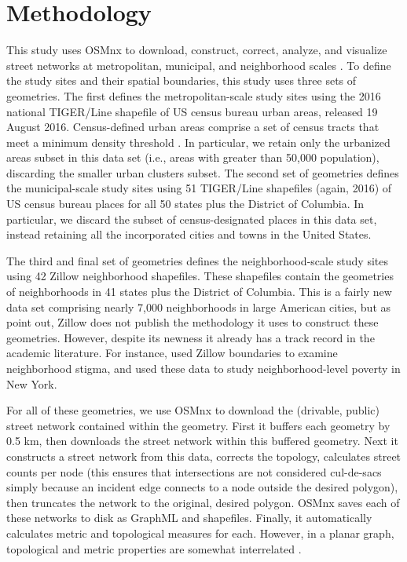 \documentclass[Afour,sageh,times]{sage/sagej}
\begin{document}
\section{Methodology}
This study uses OSMnx to download, construct, correct, analyze, and visualize street networks at metropolitan, municipal, and neighborhood scales \cite{boeing_osmnx:_2017}. To define the study sites and their spatial boundaries, this study uses three sets of geometries. The first defines the metropolitan-scale study sites using the 2016 national TIGER/Line shapefile of US census bureau urban areas, released 19 August 2016. Census-defined urban areas comprise a set of census tracts that meet a minimum density threshold \cite{u.s._census_bureau_2010_2010}. In particular, we retain only the urbanized areas subset in this data set (i.e., areas with greater than 50,000 population), discarding the smaller urban clusters subset. The second set of geometries defines the municipal-scale study sites using 51 TIGER/Line shapefiles (again, 2016) of US census bureau places for all 50 states plus the District of Columbia. In particular, we discard the subset of census-designated places in this data set, instead retaining all the incorporated cities and towns in the United States. 

The third and final set of geometries defines the neighborhood-scale study sites using 42 Zillow neighborhood shapefiles. These shapefiles contain the geometries of neighborhoods in 41 states plus the District of Columbia. This is a fairly new data set comprising nearly 7,000 neighborhoods in large American cities, but as \citet{schernthanner_spatial_2016} point out, Zillow does not publish the methodology it uses to construct these geometries. However, despite its newness it already has a track record in the academic literature. For instance, \citet{besbris_effect_2015} used Zillow boundaries to examine neighborhood stigma, and \citet{albrecht_indicator_2014} used these data to study neighborhood-level poverty in New York.

For all of these geometries, we use OSMnx to download the (drivable, public) street network contained within the geometry. First it buffers each geometry by 0.5 km, then downloads the street network within this buffered geometry. Next it constructs a street network from this data, corrects the topology, calculates street counts per node (this ensures that intersections are not considered cul-de-sacs simply because an incident edge connects to a node outside the desired polygon), then truncates the network to the original, desired polygon. OSMnx saves each of these networks to disk as GraphML and shapefiles. Finally, it automatically calculates metric and topological measures for each. However, in a planar graph, topological and metric properties are somewhat interrelated \cite{masucci_random_2009}.
\end{document}
